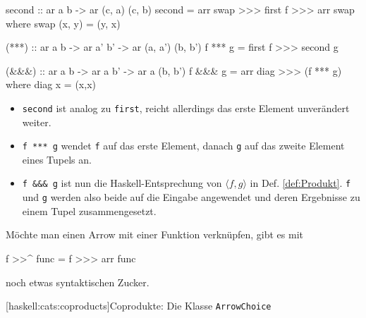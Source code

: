 \documentclass[11pt, a4paper, bibgerm]{book}
\newcommand\icode[1]{\lstinline?#1?}
\newcommand\lsubsection{}
\newcommand{\dref}[1]{Def. \ref{def:#1}}
\begin{document}
\begin{code}
  second :: ar a b -> ar (c, a) (c, b)
  second = arr swap >>> first f >>> arr swap
    where swap (x, y) = (y, x)

  (***) :: ar a b -> ar a' b' -> ar (a, a') (b, b')
  f *** g = first f >>> second g

  (&&&) :: ar a b -> ar a b' -> ar a (b, b')
  f &&& g = arr diag >>> (f *** g)
    where diag x = (x,x)
\end{code} %

\begin{itemize}
\item \icode{second} ist analog zu \icode{first}, reicht allerdings das erste
Element unverändert weiter.
\item \icode{f *** g} wendet \icode{f} auf das
erste Element, danach \icode{g} auf das zweite Element eines Tupels
an.
\item \icode{f &&& g} ist nun die Haskell-Entsprechung von $\langle f,g
\rangle$ in \dref{Produkt}. \icode{f} und \icode{g} werden also beide
auf die Eingabe angewendet und deren Ergebnisse zu einem Tupel
zusammengesetzt.
\end{itemize}

Möchte man einen Arrow mit einer Funktion verknüpfen, gibt es mit
\begin{code}
f >>^ func = f >>> arr func
\end{code}%
noch etwas syntaktischen Zucker.

\lsubsection[haskell:cats:coproducts]{Coprodukte: Die Klasse \texttt{ArrowChoice}}
\end{document}
